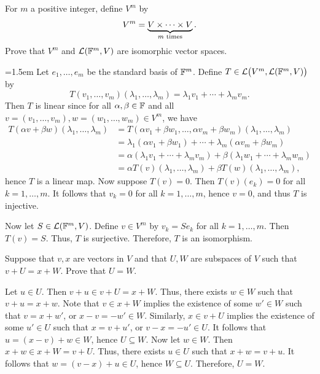 \begin{exc}
\begin{exercise}
For $m$ a positive integer, define $V^m$ by
\[ V^m = \underbrace{V\times\cdots\times V}_{m\text{ times}}. \]
Prove that $V^m$ and $\mathcal{L}(\mathbb{F}^m,V)$ are isomorphic vector spaces.
\end{exercise}
\begin{solution}\emergencystretch=1.5em
Let $e_1,\dots,e_m$ be the standard basis of $\mathbb{F}^m$. Define
$T\in\mathcal{L}\bigl(V^m,\allowbreak\mathcal{L}(\mathbb{F}^m,V)\bigr)$ by
\[ T(v_1,\dots,v_m)(\lambda_1,\dots,\lambda_m)
   = \lambda_1v_1+\cdots+\lambda_mv_m. \]
Then $T$ is linear since for all $\alpha,\beta\in\mathbb{F}$ and all
$v=(v_1,\dots,v_m),w=(w_1,\dots,w_m)\in V^m$, we have
\begin{align*}
T(\alpha v+\beta w)(\lambda_1,\dots,\lambda_m)
  &= T(\alpha v_1+\beta w_1,\dots,\alpha v_m+\beta w_m)
     (\lambda_1,\dots,\lambda_m)\\
  &= \lambda_1(\alpha v_1+\beta w_1)+\cdots+\lambda_m(\alpha v_m+\beta w_m)\\
  &= \alpha(\lambda_1v_1+\cdots+\lambda_mv_m)
     +\beta(\lambda_1w_1+\cdots+\lambda_mw_m)\\
  &= \alpha T(v)(\lambda_1,\dots,\lambda_m)
     +\beta T(w)(\lambda_1,\dots,\lambda_m),
\end{align*}
hence $T$ is a linear map. Now suppose $T(v)=0$. Then $T(v)(e_k)=0$ for all
$k=1,\dots,m$. It follows that $v_k=0$ for all $k=1,\dots,m$, hence $v=0$, and
thus $T$ is injective.

Now let $S\in\mathcal{L}(\mathbb{F}^m,V)$. Define $v\in V^m$ by $v_k=Se_k$ for all
$k=1,\dots,m$. Then $T(v)=S$. Thus, $T$ is surjective. Therefore, $T$ is an
isomorphism.
\end{solution}

\begin{exercise}
Suppose that $v,x$ are vectors in $V$ and that $U,W$ are subspaces of $V$ such
that $v+U=x+W$. Prove that $U=W$.
\end{exercise}
\begin{solution}
Let $u\in U$. Then $v+u\in v+U=x+W$. Thus, there exists $w\in W$ such that
$v+u=x+w$. Note that $v\in x+W$ implies the existence of some $w'\in W$ such
that $v=x+w'$, or $x-v=-w'\in W$. Similarly, $x\in v+U$ implies the existence of
some $u'\in U$ such that $x=v+u'$, or $v-x=-u'\in U$. It follows that
$u=(x-v)+w\in W$, hence $U\subseteq W$. Now let $w\in W$. Then
$x+w\in x+W=v+U$. Thus, there exists $u\in U$ such that $x+w=v+u$. It follows
that $w=(v-x)+u\in U$, hence $W\subseteq U$. Therefore, $U=W$.
\end{solution}


\end{exc}
